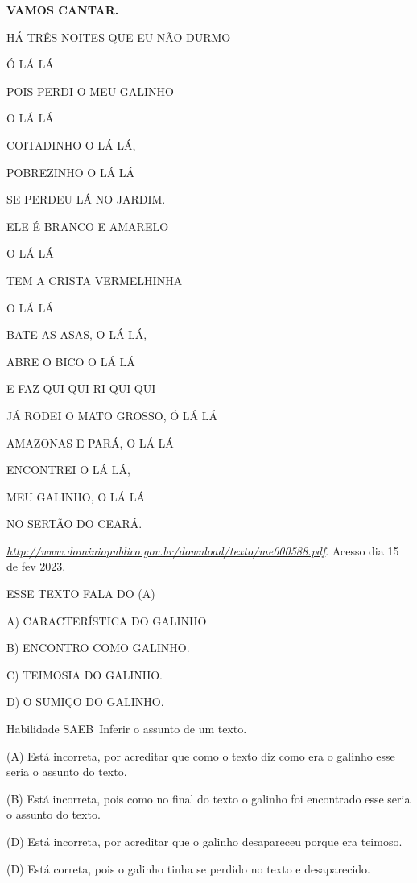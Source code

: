 \textbf{VAMOS CANTAR.}

HÁ TRÊS NOITES QUE EU NÃO DURMO

Ó LÁ LÁ

POIS PERDI O MEU GALINHO

O LÁ LÁ

COITADINHO O LÁ LÁ,

POBREZINHO O LÁ LÁ

SE PERDEU LÁ NO JARDIM.

ELE É BRANCO E AMARELO

O LÁ LÁ

TEM A CRISTA VERMELHINHA

O LÁ LÁ

BATE AS ASAS, O LÁ LÁ,

ABRE O BICO O LÁ LÁ

E FAZ QUI QUI RI QUI QUI

JÁ RODEI O MATO GROSSO, Ó LÁ LÁ

AMAZONAS E PARÁ, O LÁ LÁ

ENCONTREI O LÁ LÁ,

MEU GALINHO, O LÁ LÁ

NO SERTÃO DO CEARÁ.

\href{http://www.dominiopublico.gov.br/download/texto/me000588.pdf}{\emph{http://www.dominiopublico.gov.br/download/texto/me000588.pdf}}.
Acesso dia 15 de fev 2023.

ESSE TEXTO FALA DO (A)

A) CARACTERÍSTICA DO GALINHO

B) ENCONTRO COMO GALINHO.

C) TEIMOSIA DO GALINHO.

D) O SUMIÇO DO GALINHO.

Habilidade SAEB~Inferir o assunto de um texto.

(A) Está incorreta, por acreditar que como o texto diz como era o
galinho esse seria o assunto do texto.

(B) Está incorreta, pois como no final do texto o galinho foi encontrado
esse seria o assunto do texto.

(D) Está incorreta, por acreditar que o galinho desapareceu porque era
teimoso.

(D) Está correta, pois o galinho tinha se perdido no texto e
desaparecido.

\section{\texorpdfstring{\\
}{ }}\label{section-19}

